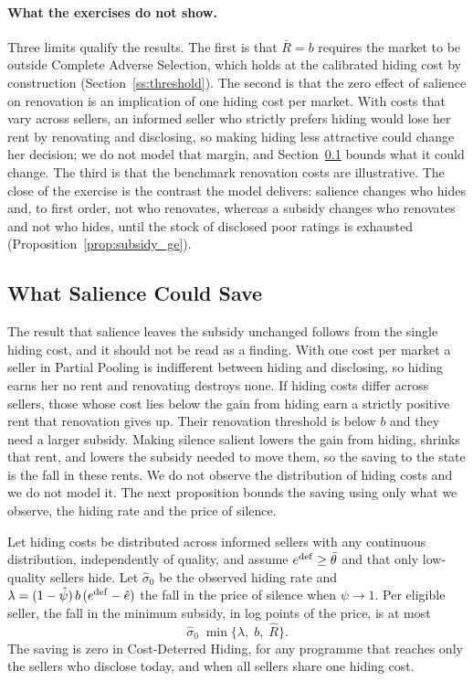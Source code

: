 \documentclass[10pt,letterpaper]{bp-template-concise}
\begin{document}
\paragraph{What the exercises do not show.}
Three limits qualify the results. The first is that $\bar R=b$ requires the market to be outside Complete Adverse Selection, which holds at the calibrated hiding cost by construction (Section~\ref{ss:threshold}). The second is that the zero effect of salience on renovation is an implication of one hiding cost per market. With costs that vary across sellers, an informed seller who strictly prefers hiding would lose her rent by renovating and disclosing, so making hiding less attractive could change her decision; we do not model that margin, and Section~\ref{ss:att_saving} bounds what it could change. The third is that the benchmark renovation costs are illustrative. The close of the exercise is the contrast the model delivers: salience changes who hides and, to first order, not who renovates, whereas a subsidy changes who renovates and not who hides, until the stock of disclosed poor ratings is exhausted (Proposition~\ref{prop:subsidy_ge}).

\subsection{What Salience Could Save}
\label{ss:att_saving}

The result that salience leaves the subsidy unchanged follows from the single hiding cost, and it should not be read as a finding. With one cost per market a seller in Partial Pooling is indifferent between hiding and disclosing, so hiding earns her no rent and renovating destroys none. If hiding costs differ across sellers, those whose cost lies below the gain from hiding earn a strictly positive rent that renovation gives up. Their renovation threshold is below $b$ and they need a larger subsidy. Making silence salient lowers the gain from hiding, shrinks that rent, and lowers the subsidy needed to move them, so the saving to the state is the fall in these rents. We do not observe the distribution of hiding costs and we do not model it. The next proposition bounds the saving using only what we observe, the hiding rate and the price of silence.

\begin{proposition}
\label{prop:att_saving}
Let hiding costs be distributed across informed sellers with any continuous distribution, independently of quality, and assume $e^{\rm def}\ge\bar\theta$ and that only low-quality sellers hide. Let $\hat\sigma_0$ be the observed hiding rate and $\lambda=(1-\hat\psi)\,b\,(e^{\rm def}-\hat e)$ the fall in the price of silence when $\psi\to1$. Per eligible seller, the fall in the minimum subsidy, in log points of the price, is at most
\[
    \hat\sigma_0\;\min\{\lambda,\;b,\;\hat R\}.
\]
The saving is zero in Cost-Deterred Hiding, for any programme that reaches only the sellers who disclose today, and when all sellers share one hiding cost.
\end{proposition}
\end{document}

